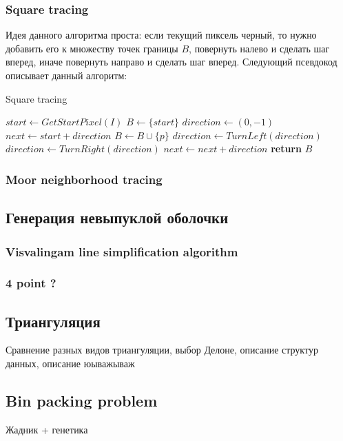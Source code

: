 \documentclass{fefu}
\begin{document}
\subsubsection{Square tracing}
Идея данного алгоритма проста: если текущий пиксель черный, то нужно добавить его к множеству точек границы $B$,
повернуть налево и сделать шаг вперед, иначе повернуть направо и сделать шаг вперед. Следующий псевдокод 
описывает данный алгоритм:
\begin{algorithm}
    \caption{Square tracing}
    \label{SquareTrace}
    \begin{algorithmic}[1] %
         
            \State $start \gets GetStartPixel(I)$
            \State $B \gets \{start\}$
            \State $direction \gets \left(0, -1\right)$
            \State $next \gets start + direction$
                    \State $B \gets B \cup \{p\}$
                    \State $direction \gets TurnLeft(direction)$
                \Else
                    \State $direction \gets TurnRight(direction)$
                \EndIf
                \State $next \gets next + direction$
            \EndWhile
            \State \textbf{return} $B$
        \EndProcedure
    \end{algorithmic}
\end{algorithm}
\subsubsection{Moor neighborhood tracing}
\subsection{Генерация невыпуклой оболочки}
\subsubsection{Visvalingam line simplification algorithm}
\subsubsection{4 point ?}
\subsection{Триангуляция}
Сравнение разных видов триангуляции, выбор Делоне, описание структур данных, описание юыважываж
\subsection{Bin packing problem}
Жадник + генетика
\newpage


\end{document}
